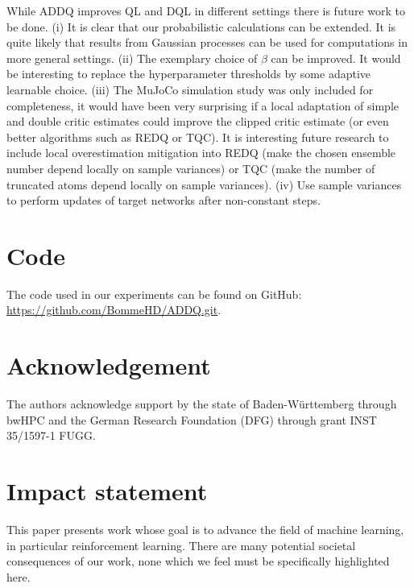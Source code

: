 \documentclass{article}
\theoremstyle{plain}
\theoremstyle{definition}
\theoremstyle{remark}
\begin{document}
While ADDQ improves QL and DQL in different settings there is future work to be done. (i) It is clear that our probabilistic calculations can be extended. It is quite likely that results from Gaussian processes can be used for computations in more general settings. (ii) The exemplary choice of $\beta$ can be improved. It would be interesting to replace the hyperparameter thresholds by some adaptive learnable choice.  (iii) The MuJoCo simulation study was only included for completeness, it would have been very surprising if a local adaptation of simple and double critic estimates could improve the clipped critic estimate (or even better  algorithms such as REDQ or TQC). It is interesting future research to include local overestimation mitigation into REDQ (make the chosen ensemble number depend locally on sample variances) or TQC (make the number of truncated atoms depend locally on sample variances). (iv) Use sample variances to perform updates of target networks after non-constant steps.

\section*{Code} The code used in our experiments can be found on GitHub: \url{https://github.com/BommeHD/ADDQ.git}.

\section*{Acknowledgement} The authors acknowledge support by the state of Baden-Württemberg through bwHPC
and the German Research Foundation (DFG) through grant INST 35/1597-1 FUGG.


\section*{Impact statement} This paper presents work whose goal is to advance the field of machine learning, in particular reinforcement learning. There are many potential societal consequences of our work, none which we feel must be specifically highlighted here.
\end{document}
